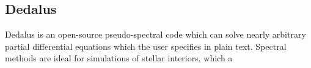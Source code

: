 {\color{purple}    
\subsection{Dedalus}}

Dedalus is an open-source pseudo-spectral code which can solve nearly arbitrary partial differential equations which the user specifies in plain text. Spectral methods are ideal for simulations of stellar interiors, which a
